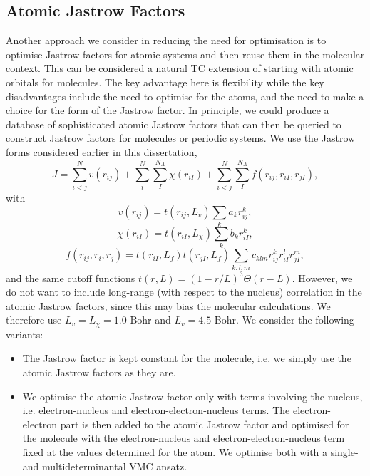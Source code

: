 \subsection{Atomic Jastrow Factors}

Another approach we consider in reducing the need for optimisation is to optimise Jastrow factors for atomic systems and then reuse them in the molecular context. This can be considered a natural TC extension of starting with atomic orbitals for molecules. The key advantage here is flexibility while the key disadvantages include the need to optimise for the atoms, and the need to make a choice for the form of the Jastrow factor. In principle, we could produce a database of sophisticated atomic Jastrow factors that can then be queried to construct Jastrow factors for molecules or periodic systems. We use the Jastrow forms considered earlier in this dissertation, \begin{equation}
    \label{eq:jastrow-3}
    J = \sum_{i<j}^Nv(r_{ij}) + \sum_i^N\sum_I^{N_A}\chi(r_{iI}) + \sum_{i<j}^N\sum_I^{N_A}f(r_{ij}, r_{iI}, r_{jI}),
\end{equation}
with
\begin{equation}
    \label{eq:dtn-jastrow-ee-3}
    v(r_{ij})    = t(r_{ij},L_v)
                    \sum_{k} a_k r_{ij}^k ,
\end{equation}
\begin{equation}
    \label{eq:dtn-jastrow-en-3}
    \chi(r_{iI}) = t(r_{iI},L_\chi)
    \sum_{k} b_k r_{iI}^k ,
\end{equation}
\begin{equation}
    \label{eq:dtn-jastrow-een-3}
    f(r_{ij}, r_{i}, r_{j}) = t(r_{iI},L_f) t(r_{jI},L_f)
    \sum_{k,l,m} c_{klm}
    r_{ij}^k r_{iI}^l r_{jI}^m ,
\end{equation}
and the same cutoff functions $t(r,L) = (1-r/L)^3
\Theta(r-L)$. However, we do not want to include long-range (with respect to the nucleus) correlation in the atomic Jastrow factors, since this may bias the molecular calculations. We therefore use $L_v=L_\chi=1.0$ Bohr and $L_{v}=4.5$ Bohr. We consider the following variants:
\begin{itemize}
    \item The Jastrow factor is kept constant for the molecule, i.e. we simply use the atomic Jastrow factors as they are.
    \item We optimise the atomic Jastrow factor only with terms involving the nucleus, i.e. electron-nucleus and electron-electron-nucleus terms. The electron-electron part is then added to the atomic Jastrow factor and optimised for the molecule with the electron-nucleus and electron-electron-nucleus term fixed at the values determined for the atom. We optimise both with a single- and multideterminantal VMC ansatz.
\end{itemize}

